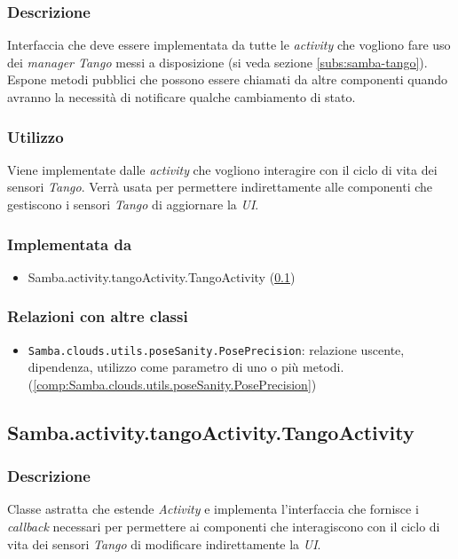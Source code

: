 \subsubsection{Descrizione}
Interfaccia che deve essere implementata da tutte le \emph{activity} che vogliono fare uso dei \emph{manager Tango} messi a disposizione (si veda sezione \ref{subs:samba-tango}). Espone metodi pubblici che possono essere chiamati da altre componenti quando avranno la necessità di notificare qualche cambiamento di stato.
\subsubsection{Utilizzo}
Viene implementate dalle \emph{activity} che vogliono interagire con il ciclo di vita dei sensori \emph{Tango}. Verrà usata per permettere indirettamente alle componenti che gestiscono i sensori \emph{Tango} di aggiornare la \emph{UI}.
\subsubsection{Implementata da}
\begin{itemize}
	\item Samba.activity.tangoActivity.TangoActivity (\ref{comp:Samba.activity.tangoActivity.TangoActivity})
\end{itemize}
\subsubsection{Relazioni con altre classi}
\begin{itemize}
 \item \texttt{Samba.clouds.utils.poseSanity.PosePrecision}: relazione uscente, dipendenza, utilizzo come parametro di uno o più metodi. (\ref{comp:Samba.clouds.utils.poseSanity.PosePrecision})
\end{itemize}

\subsection{Samba.activity.tangoActivity.TangoActivity}\label{comp:Samba.activity.tangoActivity.TangoActivity}
\subsubsection{Descrizione}
Classe astratta che estende \emph{Activity} e implementa l'interfaccia che fornisce i \emph{callback} necessari per permettere ai componenti che interagiscono con il ciclo di vita dei sensori \emph{Tango} di modificare indirettamente la \emph{UI}.
